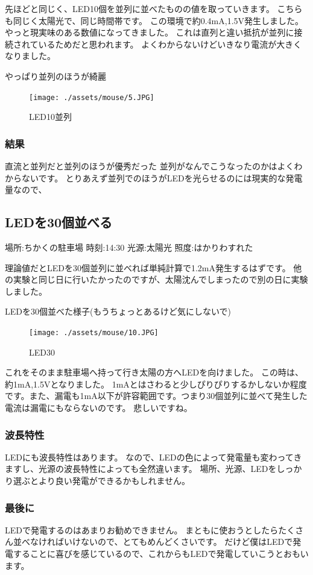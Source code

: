 先ほどと同じく、LED10個を並列に並べたものの値を取っていきます。
こちらも同じく太陽光で、同じ時間帯です。
この環境で約0.4mA,1.5V発生しました。やっと現実味のある数値になってきました。
これは直列と違い抵抗が並列に接続されているためだと思われます。
よくわからないけどいきなり電流が大きくなりました。


やっぱり並列のほうが綺麗
\begin{figure}[htbp]
    \centering
    \texttt{[image: ./assets/mouse/5.JPG]}
    \caption{LED10並列}
    \label{fig:led_par10}
\end{figure}

\subsubsection{結果}
直流と並列だと並列のほうが優秀だった
並列がなんでこうなったのかはよくわからないです。
とりあえず並列でのほうがLEDを光らせるのには現実的な発電量なので、

\subsection{LEDを30個並べる}
場所:ちかくの駐車場
時刻:14:30
光源:太陽光
照度:はかりわすれた

理論値だとLEDを30個並列に並べれば単純計算で1.2mA発生するはずです。
他の実験と同じ日に行いたかったのですが、太陽沈んでしまったので別の日に実験しました。

LEDを30個並べた様子(もうちょっとあるけど気にしないで)
\begin{figure}[htbp]
    \centering
    \texttt{[image: ./assets/mouse/10.JPG]}
    \caption{LED30}
    \label{fig:led_par10}
\end{figure}

これをそのまま駐車場へ持って行き太陽の方へLEDを向けました。
この時は、約1mA,1.5Vとなりました。
1mAとはさわると少しぴりぴりするかしないか程度です。また、漏電も1mA以下が許容範囲です。つまり30個並列に並べて発生した電流は漏電にもならないのです。
悲しいですね。

\subsubsection{波長特性}
LEDにも波長特性はあります。
なので、LEDの色によって発電量も変わってきますし、光源の波長特性によっても全然違います。
場所、光源、LEDをしっかり選ぶとより良い発電ができるかもしれません。

\subsubsection{最後に}
LEDで発電するのはあまりお勧めできません。
まともに使おうとしたらたくさん並べなければいけないので、とてもめんどくさいです。
だけど僕はLEDで発電することに喜びを感じているので、これからもLEDで発電していこうとおもいます。
